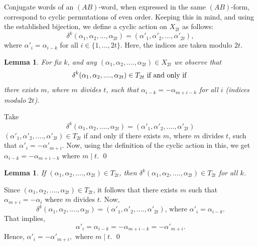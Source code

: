 \documentclass[a4paper,12pt]{amsart}
\renewenvironment{proof}{{\bfseries Proof.}}{\qed}
\numberwithin{equation}{section}
\newtheorem{lemma}[theorem]{Lemma}
\theoremstyle{definition}
\numberwithin{equation}{section}
\begin{document}
Conjugate words of an $(AB)$-word, when expressed in the same $(AB)$-form, correspond to cyclic permutations of even order. Keeping this in mind, and using the established bijection, we define a cyclic action on $X_{2t}$ as follows:
\[
\delta^k(\alpha_1, \alpha_2, \ldots, \alpha_{2t}) 
= (\alpha'_1, \alpha'_2, \ldots, \alpha'_{2t}),
\]
where $\alpha'_i = \alpha_{i-k}$ for all $i \in\{ 1, \ldots, 2t\}$. 
Here, the indices are taken modulo $2t$. 
\begin{lemma}
 For fix $k$, and any $(\alpha_1,\alpha_2,....,\alpha_{2t}) \in X_{2t}$ we observe that $$\delta^k(\alpha_1,\alpha_2,....,\alpha_{2t}) \in T_{2t} \hbox{ if and only if }$$ there exists $m$, where $m$ divides $t$, such that $\alpha_{i-k} = -\alpha_{m+i-k}$ for all $i$ (indices modulo $2t$). 

\end{lemma}
\begin{proof}
    Take $$\delta^k(\alpha_1,\alpha_2,....,\alpha_{2t}) = (\alpha'_1,\alpha'_2,....,\alpha'_{2t})$$
    $(\alpha'_1,\alpha'_2,....,\alpha'_{2t}) \in T_{2t}$ if and only if there exists $m$, where $m$ divides $t$, such that $\alpha'_i=-\alpha'_{m+i}$. Now, using the definition of the cyclic action in this, we get $\alpha_{i-k} = -\alpha_{m+i-k}$ where  $m\; \lvert\;t$. 
\end{proof}
 \begin{lemma}
     If $(\alpha_1,\alpha_2,....,\alpha_{2t}) \in T_{2t}$, then $\delta^k(\alpha_1,\alpha_2,....,\alpha_{2t}) \in T_{2t}$ for all $k$.
 \end{lemma}
\begin{proof}
    Since $(\alpha_1,\alpha_2,....,\alpha_{2t}) \in T_{2t}$, it follows that there exists $m$ such that $\alpha_{m+i}=-\alpha_{i}$ where $m$ divides $t$. Now,
    $$\delta^k(\alpha_1,\alpha_2,....,\alpha_{2t}) = (\alpha'_1,\alpha'_2,....,\alpha'_{2t}) \text{, where }\alpha'_{i}=\alpha_{i-k}.$$ That implies, $$ \alpha'_{i} = \alpha_{i-k} = -\alpha_{m+i-k}=-\alpha'_{m+i}.$$
    Hence, $\alpha'_i=-\alpha'_{m+i}, \text{ where } m\;\lvert\;t .$
\end{proof}
\end{document}
